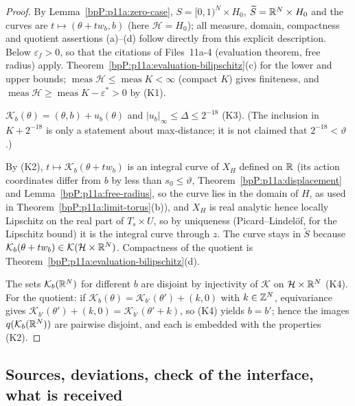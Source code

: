\begin{proof}
\label{stepP:p11a:pi-zero} By Lemma~\ref{bpP:p11a:zero-case}, $S=[0,1)^N\times H_0$, $\widetilde S=\mathbb{R}^N\times H_0$ and the curves are $t\mapsto(\theta+tw_b,b)$ (here $\mathcal H=H_0$); all measure, domain, compactness and quotient assertions (a)--(d) follow directly from this explicit description. Below $\varepsilon_f>0$, so that the citations of Files~11a-4 (evaluation theorem, free radius) apply.
\label{stepP:p11a:pi-a} Theorem~\ref{bpP:p11a:evaluation-bilipschitz}(c) for the lower and upper bounds; $\operatorname{meas}\mathcal H\le\operatorname{meas}K<\infty$ (compact $K$) gives finiteness, and $\operatorname{meas}\mathcal H\ge\operatorname{meas}K-\varepsilon^*>0$ by (K1).

\label{stepP:p11a:pi-b} $\mathcal K_b(\theta)=(\theta,b)+u_b(\theta)$ and $\lvert u_b\rvert_\infty\le\Delta\le2^{-18}$ (K3). (The inclusion in $K+2^{-18}$ is only a statement about max-distance; it is not claimed that $2^{-18}<\vartheta$.)

\label{stepP:p11a:pi-c} By (K2), $t\mapsto\mathcal K_b(\theta+tw_b)$ is an integral curve of $X_H$ defined on $\mathbb{R}$ (its action coordinates differ from $b$ by less than $s_0\le\vartheta$, Theorem~\ref{bpP:p11a:displacement} and Lemma~\ref{bpP:p11a:free-radius}, so the curve lies in the domain of $H$, as used in Theorem~\ref{bpP:p11a:limit-torus}(b)), and $X_H$ is real analytic hence locally Lipschitz on the real part of $T_s\times U$, so by uniqueness (Picard--Lindel\"of,  for the Lipschitz bound) it is the integral curve through $z$. The curve stays in $\widetilde S$ because $\mathcal K_b(\theta+tw_b)\in\mathcal K(\mathcal H\times\mathbb{R}^N)$. Compactness of the quotient is Theorem~\ref{bpP:p11a:evaluation-bilipschitz}(d).

\label{stepP:p11a:pi-d} The sets $\mathcal K_b(\mathbb{R}^N)$ for different $b$ are disjoint by injectivity of $\mathcal K$ on $\mathcal H\times\mathbb{R}^N$ (K4). For the quotient: if $\mathcal K_b(\theta)=\mathcal K_{b'}(\theta')+(k,0)$ with $k\in\mathbb{Z}^N$, equivariance gives $\mathcal K_{b'}(\theta')+(k,0)=\mathcal K_{b'}(\theta'+k)$, so (K4) yields $b=b'$; hence the images $q(\mathcal K_b(\mathbb{R}^N))$ are pairwise disjoint, and each is embedded with the properties (K2).
\end{proof}

\subsection{Sources, deviations, check of the interface, what is received}\label{bpP:p11a:notes5}

